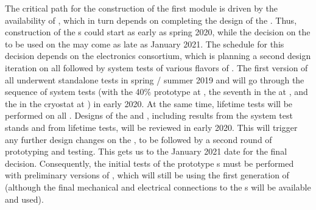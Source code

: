 The critical path for the construction of the first 
  module is driven by the availability of ,
which in turn depends on completing the design of the
. Thus, construction
of the s could start as early as spring 2020, while the
decision on the  to be used on the 
may come as late as January 2021. The schedule for this decision
depends on the  electronics consortium, which is
planning a second design iteration on all 
followed by system tests of various flavors of .
The first version of all  underwent
standalone tests in spring / summer 2019 and will go through the 
sequence of system tests (with the 40\%  prototype at ,
the seventh   in the \coldbox at ,
and the  in the  cryostat at )
in early 2020. At the same time, lifetime tests will be performed 
on all . Designs of the  and , including results
from the system test stands and from lifetime tests, will be reviewed
in early 2020. This will trigger any further design
changes on the , to be followed by a second round of prototyping
and testing. This gets us to the January 2021 date for the final
 decision. Consequently, the initial
tests of the  prototype s must be performed
with preliminary versions of , which will still be using
the first generation of  (although the final 
mechanical and electrical connections to the s will be available and used).

